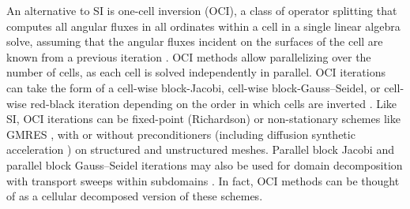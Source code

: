 



An alternative to SI is one-cell inversion (OCI), a class of operator splitting that computes all angular fluxes in all ordinates within a cell in a single linear algebra solve, assuming that the angular fluxes incident on the surfaces of the cell are known from a previous iteration \cite{kang2000oci}.
OCI methods allow parallelizing over the number of cells, as each cell is solved independently in parallel.
OCI iterations can take the form of a cell-wise block-Jacobi, cell-wise block-Gauss--Seidel, or cell-wise red-black iteration depending on the order in which cells are inverted \cite{man1994parallel}.
Like SI, OCI iterations can be fixed-point (Richardson) or non-stationary schemes like GMRES \cite{kylov2004warsa}, with or without preconditioners (including diffusion synthetic acceleration \cite{kang2000oci}) on structured and unstructured meshes.
Parallel block Jacobi and parallel block Gauss--Seidel iterations may also be used for domain decomposition with transport sweeps within subdomains \cite{qiao_improved_2021}.
In fact, OCI methods can be thought of as a cellular decomposed version of these schemes.

